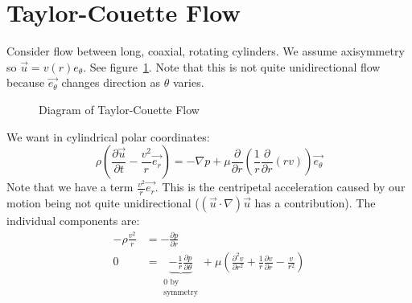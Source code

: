 \documentclass[../Main.tex]{subfiles}
\begin{document}
\section{Taylor-Couette Flow}
Consider flow between long, coaxial, rotating cylinders. We assume axisymmetry so $\vec{u} = v(r) e_\theta$. See figure~\ref{figTaylorCouette}. Note that this is not quite unidirectional flow because $\vec{e_\theta}$ changes direction as $\theta$ varies.
\begin{figure}
    \centering
    \caption{Diagram of Taylor-Couette Flow}
    \label{figTaylorCouette}
\end{figure}
We want  in cylindrical polar coordinates:
\begin{equation}
    \rho\left(\frac{\partial \vec{u}}{\partial t} - \frac{v^2}{r} \vec{e_r}\right) = -\nabla p + \mu \frac{\partial }{\partial r}\left( \frac1r \frac{\partial}{\partial r} \left(rv\right)\right) \vec{e_\theta}
    \label{eqnNavierStokesCylinder}
\end{equation}
Note that we have a term $\frac{v^2}{r} \vec{e_r}$. This is the centripetal acceleration caused by our motion being not quite unidirectional ($(\vec{u} \cdot \nabla)\vec{u}$ has a contribution).
The individual components are:
\begin{align}
    -\rho \frac{v^2}{r} &= -\frac{\partial p}{\partial r} \label{eqnNSRadial} \\
    0 &= \underbrace{-\frac1r \frac{\partial p}{\partial \theta}}_{\substack{0 \text{ by}\\\text{symmetry}}} + \mu \left(\frac{\partial^{2}v}{\partial r^{2}} + \frac1r \frac{\partial v}{\partial r} - \frac{v}{r^2}\right) \label{eqnNSAzimuth}
\end{align}
\end{document}
